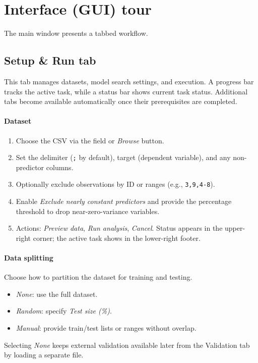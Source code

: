 \documentclass[11pt,a4paper]{article}
\begin{document}
\section{Interface (GUI) tour}
The main window presents a tabbed workflow.

\subsection{\textbf{Setup \& Run} tab}
This tab manages datasets, model search settings, and execution. A progress bar tracks the active task, while a status bar shows current task status. Additional tabs become available automatically once their prerequisites are completed.
\paragraph{Dataset}
\begin{enumerate}[label=\arabic*.]
  \item Choose the CSV via the field or \emph{Browse} button.
  \item Set the delimiter (\verb|;| by default), target (dependent variable), and any non-predictor columns.
  \item Optionally exclude observations by ID or ranges (e.g., \texttt{3,9,4-8}).
  \item Enable \emph{Exclude nearly constant predictors} and provide the percentage threshold to drop near-zero-variance variables.
  \item Actions: \emph{Preview data}, \emph{Run analysis}, \emph{Cancel}. Status appears in the upper-right corner; the active task shows in the lower-right footer.
\end{enumerate}

\paragraph{Data splitting}
Choose how to partition the dataset for training and testing.
\begin{itemize}
  \item \emph{None}: use the full dataset.
  \item \emph{Random}: specify \emph{Test size (\%)}.
  \item \emph{Manual}: provide train/test lists or ranges without overlap.
\end{itemize}
Selecting \emph{None} keeps external validation available later from the Validation tab by loading a separate file.
\newpage
\end{document}
